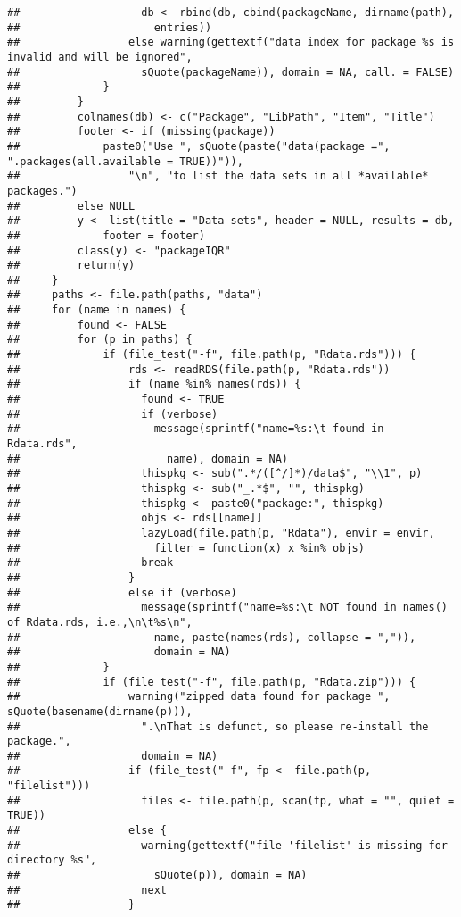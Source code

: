 \documentclass[]{article}
\begin{document}
\begin{verbatim}
##                   db <- rbind(db, cbind(packageName, dirname(path), 
##                     entries))
##                 else warning(gettextf("data index for package %s is invalid and will be ignored", 
##                   sQuote(packageName)), domain = NA, call. = FALSE)
##             }
##         }
##         colnames(db) <- c("Package", "LibPath", "Item", "Title")
##         footer <- if (missing(package)) 
##             paste0("Use ", sQuote(paste("data(package =", ".packages(all.available = TRUE))")), 
##                 "\n", "to list the data sets in all *available* packages.")
##         else NULL
##         y <- list(title = "Data sets", header = NULL, results = db, 
##             footer = footer)
##         class(y) <- "packageIQR"
##         return(y)
##     }
##     paths <- file.path(paths, "data")
##     for (name in names) {
##         found <- FALSE
##         for (p in paths) {
##             if (file_test("-f", file.path(p, "Rdata.rds"))) {
##                 rds <- readRDS(file.path(p, "Rdata.rds"))
##                 if (name %in% names(rds)) {
##                   found <- TRUE
##                   if (verbose) 
##                     message(sprintf("name=%s:\t found in Rdata.rds", 
##                       name), domain = NA)
##                   thispkg <- sub(".*/([^/]*)/data$", "\\1", p)
##                   thispkg <- sub("_.*$", "", thispkg)
##                   thispkg <- paste0("package:", thispkg)
##                   objs <- rds[[name]]
##                   lazyLoad(file.path(p, "Rdata"), envir = envir, 
##                     filter = function(x) x %in% objs)
##                   break
##                 }
##                 else if (verbose) 
##                   message(sprintf("name=%s:\t NOT found in names() of Rdata.rds, i.e.,\n\t%s\n", 
##                     name, paste(names(rds), collapse = ",")), 
##                     domain = NA)
##             }
##             if (file_test("-f", file.path(p, "Rdata.zip"))) {
##                 warning("zipped data found for package ", sQuote(basename(dirname(p))), 
##                   ".\nThat is defunct, so please re-install the package.", 
##                   domain = NA)
##                 if (file_test("-f", fp <- file.path(p, "filelist"))) 
##                   files <- file.path(p, scan(fp, what = "", quiet = TRUE))
##                 else {
##                   warning(gettextf("file 'filelist' is missing for directory %s", 
##                     sQuote(p)), domain = NA)
##                   next
##                 }

\end{verbatim}
\end{document}
